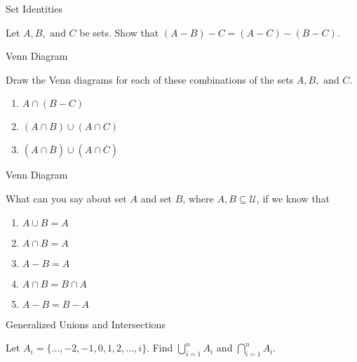 \documentclass{beamer}
\begin{document}
\begin{frame}[t]{Set Identities}
    \begin{example}
        Let $A,B, \text{ and } C$ be sets. Show that $(A - B) - C = (A - C) - (B - C)$.
    \end{example}
\end{frame}

\begin{frame}[t]{Venn Diagram}
    \begin{example}
        Draw the Venn diagrams for each of these combinations of the sets $A, B, \text{ and } C$. 
        \begin{enumerate}
            \item $A \cap (B - C)$
            \item $(A \cap B) \cup (A \cap C)$
            \item $(A \cap \overline{B}) \cup (A \cap \overline{C})$
        \end{enumerate}
    \end{example}
\end{frame}

\begin{frame}[t]{Venn Diagram}
    \begin{example}
        What can you say about set $A$ and set $B$, where $A,B \subseteq \mathcal{U}$, if we know that \begin{enumerate}
            \item $A \cup B = A$
            \item $A \cap B = A$
            \item $A - B = A$
            \item $A \cap B = B \cap A$
            \item $A - B = B - A$
        \end{enumerate}
    \end{example}
\end{frame}

\begin{frame}{}
\end{frame}

\begin{frame}[t]{Generalized Unions and Intersections}
    \begin{example}
        Let $A_i = \{\dots,-2,-1,0,1,2,\dots,i\}$. Find $\bigcup_{i=1}^{n} A_i$ and $\bigcap_{i=1}^{n} A_i$.
    \end{example}
\end{frame}
\end{document}

